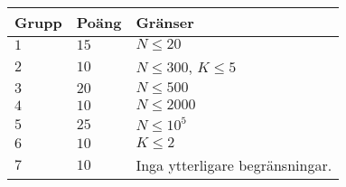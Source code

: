 \noindent
\begin{tabular}{| l | l | p{12cm} |}
  \hline
  \textbf{Grupp} & \textbf{Poäng} & \textbf{Gränser} \\ \hline 
  $1$   & $15$       & $N \leq 20$\\ \hline
  $2$   & $10$       & $N \leq 300$, $K \leq 5$  \\ \hline
  $3$   & $20$       & $N \leq 500$ \\ \hline
  $4$   & $10$       & $N \leq 2000$ \\ \hline
  $5$   & $25$       & $N \leq 10^5$ \\ \hline
  $6$   & $10$       & $K \leq 2$ \\ \hline
  $7$   & $10$       & Inga ytterligare begränsningar. \\ \hline
\end{tabular}
